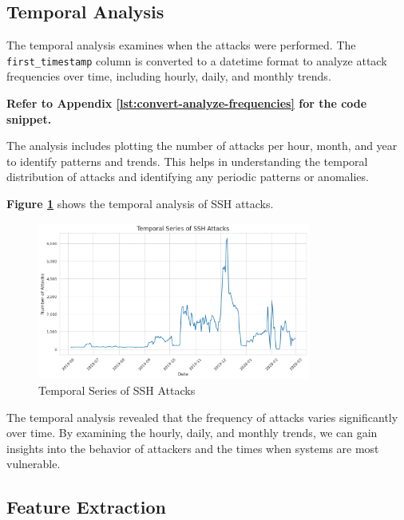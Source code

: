     \subsection{Temporal Analysis}
    
        The temporal analysis examines when the attacks were performed. The \texttt{first\_timestamp} column is converted to a datetime format to analyze attack frequencies over time, including hourly, daily, and monthly trends.
            
        \textbf{Refer to Appendix \ref{lst:convert-analyze-frequencies} for the code snippet.}

        The analysis includes plotting the number of attacks per hour, month, and year to identify patterns and trends. This helps in understanding the temporal distribution of attacks and identifying any periodic patterns or anomalies.

        \textbf{Figure \ref{fig:temporal-analysis}} shows the temporal analysis of SSH attacks.

        \begin{figure}[h]
            \centering
            \includegraphics[width=0.8\textwidth]{../figures/plots/section1/temporal_series_of_ssh_attacks.png}
            \caption{Temporal Series of SSH Attacks}
            \label{fig:temporal-analysis}
        \end{figure}

        The temporal analysis revealed that the frequency of attacks varies significantly over time. By examining the hourly, daily, and monthly trends, we can gain insights into the behavior of attackers and the times when systems are most vulnerable.

    \subsection{Feature Extraction}
    

